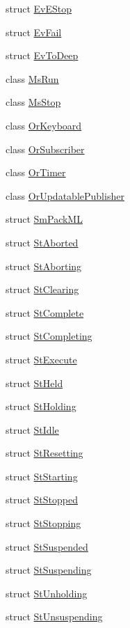 \begin{DoxyCompactItemize}
\item 
struct \hyperlink{structsm__packML_1_1EvEStop}{Ev\+E\+Stop}
\item 
struct \hyperlink{structsm__packML_1_1EvFail}{Ev\+Fail}
\item 
struct \hyperlink{structsm__packML_1_1EvToDeep}{Ev\+To\+Deep}
\item 
class \hyperlink{classsm__packML_1_1MsRun}{Ms\+Run}
\item 
class \hyperlink{classsm__packML_1_1MsStop}{Ms\+Stop}
\item 
class \hyperlink{classsm__packML_1_1OrKeyboard}{Or\+Keyboard}
\item 
class \hyperlink{classsm__packML_1_1OrSubscriber}{Or\+Subscriber}
\item 
class \hyperlink{classsm__packML_1_1OrTimer}{Or\+Timer}
\item 
class \hyperlink{classsm__packML_1_1OrUpdatablePublisher}{Or\+Updatable\+Publisher}
\item 
struct \hyperlink{structsm__packML_1_1SmPackML}{Sm\+Pack\+ML}
\item 
struct \hyperlink{structsm__packML_1_1StAborted}{St\+Aborted}
\item 
struct \hyperlink{structsm__packML_1_1StAborting}{St\+Aborting}
\item 
struct \hyperlink{structsm__packML_1_1StClearing}{St\+Clearing}
\item 
struct \hyperlink{structsm__packML_1_1StComplete}{St\+Complete}
\item 
struct \hyperlink{structsm__packML_1_1StCompleting}{St\+Completing}
\item 
struct \hyperlink{structsm__packML_1_1StExecute}{St\+Execute}
\item 
struct \hyperlink{structsm__packML_1_1StHeld}{St\+Held}
\item 
struct \hyperlink{structsm__packML_1_1StHolding}{St\+Holding}
\item 
struct \hyperlink{structsm__packML_1_1StIdle}{St\+Idle}
\item 
struct \hyperlink{structsm__packML_1_1StResetting}{St\+Resetting}
\item 
struct \hyperlink{structsm__packML_1_1StStarting}{St\+Starting}
\item 
struct \hyperlink{structsm__packML_1_1StStopped}{St\+Stopped}
\item 
struct \hyperlink{structsm__packML_1_1StStopping}{St\+Stopping}
\item 
struct \hyperlink{structsm__packML_1_1StSuspended}{St\+Suspended}
\item 
struct \hyperlink{structsm__packML_1_1StSuspending}{St\+Suspending}
\item 
struct \hyperlink{structsm__packML_1_1StUnholding}{St\+Unholding}
\item 
struct \hyperlink{structsm__packML_1_1StUnsuspending}{St\+Unsuspending}
\end{DoxyCompactItemize}
